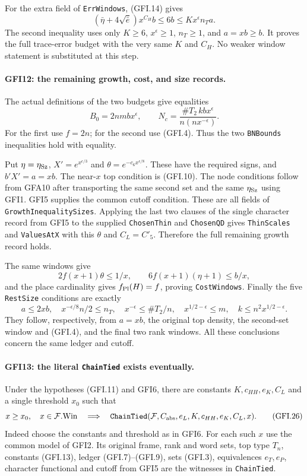 For the extra field of \texttt{ErrWindows}, (GFI.14) gives
\[
 (\bar\eta+4\sqrt{\bar e})x^{C_H}b\le6b
 \le Kx^\epsilon n_Ta.                                \tag{GFI.22}
\]
The second inequality uses only $K\ge6$, $x^\epsilon\ge1$,
$n_T\ge1$, and $a=xb\ge b$.  It proves the full trace-error
budget with the very same $K$ and $C_H$.  No weaker window
statement is substituted at this step.

\paragraph{GFI12: the remaining growth, cost, and size records.}
\label{claim:GFI12}
The actual definitions of the two budgets give equalities
\[
 B_0=2nmbx^\epsilon,\qquad
 N_c=\frac{\#T_2\,kb x^\epsilon}{n(nx^{-\epsilon})}.      \tag{GFI.23}
\]
For the first use $f=2n$; for the second use (GFI.4).
Thus the two \texttt{BNBounds} inequalities hold with equality.

Put $\eta=\eta_{\rm Sz}$, $X'=e^{x^{\epsilon/3}}$ and
$\theta=e^{-c_6x^{\epsilon/8}}$.  These have the required signs,
and $b'X'=a=xb$.  The near-$x$ top condition is (GFI.10).
The node conditions follow from GFA10 after transporting the same
second set and the same $\eta_{\rm Sz}$ using GFI1.  GFI5 supplies
the common cutoff condition.  These are all fields of
\texttt{GrowthInequalitySizes}.  Applying the last two clauses
of the single character record from GFI5 to the supplied
\texttt{ChosenThin} and \texttt{ChosenQD} gives
\texttt{ThinScales} and \texttt{ValuesAtX} with this $\theta$
and $C_L=C'_5$.  Therefore the full remaining growth record holds.

The same windows give
\[
 2f(x+1)\theta\le1/x,\qquad
 6f(x+1)(\eta+1)\le b/x,                                \tag{GFI.24}
\]
and the place cardinality gives $f_{\rm Pl}(H)=f$, proving
\texttt{CostWindows}.  Finally the five \texttt{RestSize}
conditions are exactly
\[
 a\le2xb,\quad x^{-\epsilon/8}n/2\le n_T,\quad
 x^{-\epsilon}\le\#T_2/n,\quad
 x^{1/2-\epsilon}\le m,\quad k\le n^2x^{1/2-\epsilon}.
                                                               \tag{GFI.25}
\]
They follow, respectively, from $a=xb$, the original top density,
the second-set window and (GFI.4), and the final two rank windows.
All these conclusions concern the same ledger and cutoff.

\paragraph{GFI13: the literal \texttt{ChainTied} exists eventually.}
\label{claim:GFI13}
Under the hypotheses (GFI.11) and GFI6, there are constants
$K,c_{HH},e_K,C_L$ and a single threshold $x_0$ such that
\[
 x\ge x_0,\quad x\in\mathcal F.\mathrm{Win}
 \quad\Longrightarrow\quad
 \texttt{ChainTied}(\mathcal F,C_{\rm abs},e_L,
                              K,c_{HH},e_K,C_L,x).               \tag{GFI.26}
\]
Indeed choose the constants and threshold as in GFI6.  For each such
$x$ use the common model of GFI2.  Its original frame, rank and
word sets, top type $T_n$, constants (GFI.13), ledger (GFI.7)--(GFI.9),
sets (GFI.3), equivalences $e_T,e_P$, character functional and cutoff
from GFI5 are the witnesses in \texttt{ChainTied}.

